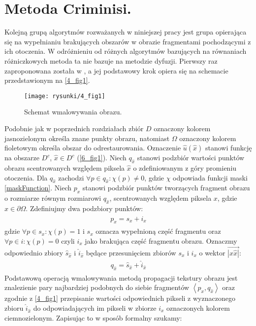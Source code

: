 \documentclass[12pt, twoside, openany]{report}
\theoremstyle{definition}
\begin{document}
\section{Metoda Criminisi.}
Kolejną grupą algorytmów rozważanych w niniejszej pracy jest grupa opierająca się na wypełnianiu brakujących obszarów w obrazie fragmentami pochodzącymi z ich otoczenia. W odróżnieniu od różnych algorytmów bazujących na równaniach różniczkowych metoda ta nie bazuje na metodzie dyfuzji. Pierwszy raz zaproponowana została w \cite{efros1999texture}, a jej podstawowy krok opiera się na schemacie przedstawionym na \autoref{4_fig1}.
\begin{figure}[!h]
	\centering
	\texttt{[image: rysunki/4\_fig1]}
	\caption{Schemat wmalowywania obrazu.}
	\label{4_fig1}
\end{figure}
Podobnie jak w poprzednich rozdziałach zbiór $D$ oznaczony kolorem jasnozielonym określa znane punkty obrazu, natomiast $\Omega$ oznaczony kolorem fioletowym określa obszar do odrestaurowania.
Oznaczenie $\hat{u}(\hat{x})$ stanowi funkcję na obszarze $D^c$, $\hat{x}  \in D^c$ (\autoref{6_fig1}).
Niech $q_{\hat{x}}$ stanowi podzbiór wartości punktów obrazu scentrowanych względem piksela $\hat{x}$ o zdefiniowanym z góry promieniu otoczenia.
Dla $q_{\hat{x}}$ zachodzi $\forall p \in q_{\hat{x}} : \chi(p) \neq 0$, gdzie $\chi$ odpowiada funkcji maski \eqref{maskFunction}.
Niech $p_{x}$ stanowi podzbiór punktów tworzących fragment obrazu o rozmiarze równym rozmiarowi $q_{\hat{x}}$, scentrowanych względem piksela $x$, gdzie $x \in \partial \Omega$.
Zdefiniujmy dwa podzbiory punktów:
\begin{align}
\begin{aligned}
p_{x} = s_x + i_x
\end{aligned}
\end{align}
gdzie $\forall p \in s_x : \chi(p) = 1$ i $s_x$ oznacza wypełnioną część fragmentu oraz $\forall p \in i : \chi(p) = 0$ czyli $i_x$ jako brakująca część fragmentu obrazu.  
Oznaczmy odpowiednio zbiory $\hat{s}_{\hat{x}}$ i $\hat{i}_{\hat{x}}$ będące przesunięciem zbiorów $s_x$ i $i_x$ o wektor $\overrightarrow{|x \hat{x}|}$:
\begin{align}
\begin{aligned}
q_{\hat{x}} = \hat{s}_{\hat{x}} + \hat{i}_{\hat{x}}
\end{aligned}
\end{align}
Podstawową operacją wmalowywania metodą propagacji tekstury obrazu jest znalezienie pary
 najbardziej podobnych do siebie fragmentów $\left\langle p_{x}, q_{\hat{x}} \right\rangle $ oraz zgodnie z \autoref{4_fig1} przepisanie wartości odpowiednich pikseli z wyznaczonego zbioru $\hat{i}_{\hat{x}}$ do odpowiadających im pikseli w zbiorze $i_x$ oznaczonych kolorem ciemnozielonym. Zapisując to w sposób formalny szukamy:
\end{document}
